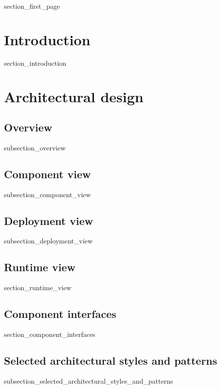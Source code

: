 \documentclass[a4paper]{article}
\begin{document}
{section_first_page}

\newpage
{}

\tableofcontents

\newpage
{}

\section{Introduction}\label{introduction}

{section_introduction}

\newpage

\section{Architectural design}\label{architectural_design}

\subsection{Overview}

{subsection_overview}

\subsection{Component view}

{subsection_component_view}

\subsection{Deployment view}

{subsection_deployment_view}

\subsection{Runtime view}
{section_runtime_view}

\subsection{Component interfaces}
{section_component_interfaces}

\subsection{Selected architectural styles and patterns}
{subsection_selected_architectural_styles_and_patterns}
\end{document}
